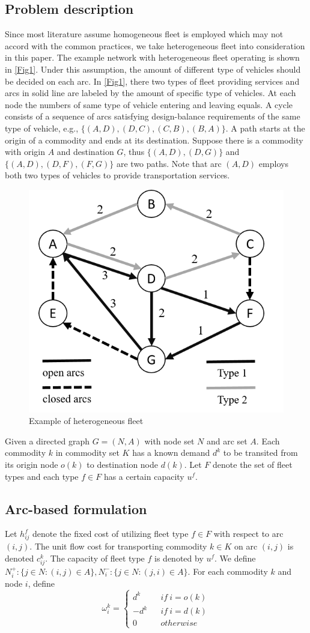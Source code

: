 \documentclass[11pt,nonblindrev,fleqn]{article}
\begin{document}
\subsection{Problem description}
Since most literature assume homogeneous fleet is employed which may not accord with the common practices, we take heterogeneous fleet into consideration in this paper. The example network with heterogeneous fleet operating is shown in \autoref{Fig1}. Under this assumption, the amount of different type of vehicles should be decided on each arc. In \autoref{Fig1}, there two types of fleet providing services and arcs in solid line are labeled by the amount of specific type of vehicles. At each node the numbers of same type of vehicle entering and leaving equals. A cycle consists of a sequence of arcs satisfying design-balance requirements of the same type of vehicle, e.g., $\{ (A,D),(D,C),(C,B),(B,A) \}$. A path starts at the origin of a commodity and ends at its destination. Suppose there is a commodity with origin $A$ and destination $G$, thus $\{ (A,D),(D,G) \}$ and $\{ (A,D),(D,F),(F,G) \}$ are two paths. Note that arc $(A,D)$ employs both two types of vehicles to provide transportation services.

\begin{figure}[H]
\setlength{\abovecaptionskip}{-5pt}
\setlength{\belowcaptionskip}{-5pt}
\centering
\includegraphics[width=0.4\linewidth]{F1.png}
\caption{Example of heterogeneous fleet}
\label{Fig1}
\end{figure}

Given a directed graph $G=(N,A)$ with node set $N$ and arc set $A$. Each commodity $k$ in commodity set $K$ has a known demand $d^k$ to be transited from its origin node $o(k)$ to destination node $d(k)$. Let $F$ denote the set of fleet types and each type $f\in F$ has a certain capacity $u^f$.

\subsection{Arc-based formulation}
Let  $h_{ij}^f$ denote the fixed cost of utilizing fleet type $f\in F$ with respect to arc $(i,j)$. The unit flow cost for transporting commodity $k\in K$ on arc $(i,j)$ is denoted $c_{ij}^k$. The capacity of fleet type $f$ is denoted by $u^f$. We define $N_i^+:\{j\in N:(i,j)\in A\},N_i^-:\{j\in N:(j,i)\in A\}$. For each commodity $k$ and node $i$, define
\begin{equation*}
\omega_i^k= \left\{
\begin{aligned}
d^k&  & if \ i=o(k) \\
-d^k&  & if \ i=d(k) \\
0&  & otherwise
\end{aligned}
\right.
\end{equation*}
\end{document}
